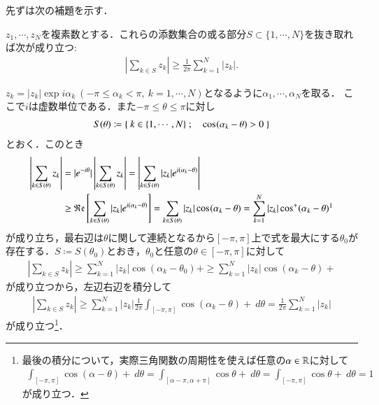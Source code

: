 	先ずは次の補題を示す．
	
	\begin{itembox}[l]{}
		\begin{lem}
			$z_1,\cdots,z_N$を複素数とする．これらの添数集合の或る部分$S \subset \{1,\cdots,N\}$を抜き取れば次が成り立つ:
			\begin{align}
				\left| \sum_{k \in S} z_k \right| \geq \frac{1}{2\pi} \sum_{k=1}^{N} |z_k|.
			\end{align}
			\label{lem:total_variation_measure_bounded}
		\end{lem}
	\end{itembox}
	
	\begin{prf}[補題]
		$z_k = |z_k|\exp{i \alpha_k}\ (-\pi \leq \alpha_k < \pi,\ k=1,\cdots,N)$となるように$\alpha_1,\cdots,\alpha_N$を取る．
		ここで$i$は虚数単位である．また$-\pi \leq \theta \leq \pi$に対し
		\begin{align}
			S(\theta) \coloneqq \left\{\ k \in \{1,\cdots,N\}\ ;\quad \operatorname{cos}^{} (\alpha_k - \theta) > 0\ \right\}
		\end{align}
		とおく．このとき
		\begin{align}
			\left| \sum_{k \in S(\theta)} z_k \right| &= |\exp{-i\theta}|\left| \sum_{k \in S(\theta)} z_k \right| = \left| \sum_{k \in S(\theta)} |z_k|\exp{i(\alpha_k - \theta)} \right| \\
			&\geq \Re{\sum_{k \in S(\theta)} |z_k|\exp{i(\alpha_k - \theta)}} = \sum_{k \in S(\theta)} |z_k| \cos{(\alpha_k - \theta)}{} = \sum_{k=1}^{N} |z_k| \cos{(\alpha_k - \theta)}{+}
			\footnotemark
		\end{align}
		が成り立ち，最右辺は$\theta$に関して連続となるから$[-\pi,\pi]$上で式を最大にする$\theta_0$が存在する．$S \coloneqq S(\theta_0)$とおき，$\theta_0$と任意の$\theta \in [-\pi,\pi]$に対して
		\begin{align}
			\left| \sum_{k \in S} z_k \right| \geq \sum_{k=1}^{N} |z_k| \cos{(\alpha_k - \theta_0)}{+} \geq \sum_{k=1}^{N} |z_k| \cos{(\alpha_k - \theta)}{+}
		\end{align}
		が成り立つから，左辺右辺を積分して
		\begin{align}
			\left| \sum_{k \in S} z_k \right| \geq \sum_{k=1}^{N} |z_k| \frac{1}{2\pi} \int_{[-\pi,\pi]} \cos{(\alpha_k - \theta)}{+}\ d\theta
			= \frac{1}{2\pi} \sum_{k=1}^{N} |z_k|
		\end{align}
		が成り立つ\footnote{
			最後の積分について，実際三角関数の周期性を使えば任意の$\alpha \in \mathbb{R}$に対して
			\begin{align}
				\int_{[-\pi,\pi]} \cos{(\alpha - \theta)}{+}\ d\theta = \int_{[\alpha-\pi,\alpha+\pi]} \cos{\theta}{+}\ d\theta = \int_{[-\pi,\pi]} \cos{\theta}{+}\ d\theta = 1
			\end{align}
			が成り立つ．
		}．
		\QED
	\end{prf}
	
